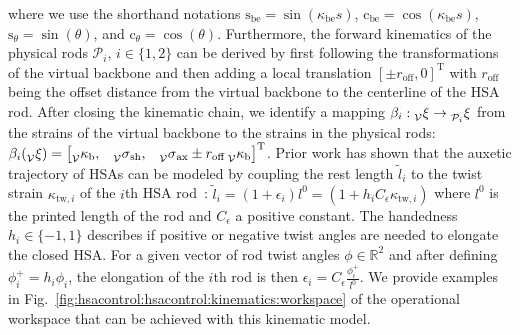 where we use the shorthand notations $\mathrm{s}_\mathrm{be} = \sin(\kappa_\mathrm{be}s)$, $\mathrm{c}_\mathrm{be} = \cos(\kappa_\mathrm{be}s)$, $\mathrm{s}_\theta = \sin(\theta)$, and $\mathrm{c}_\theta = \cos(\theta)$.
Furthermore, the forward kinematics of the physical rods $\mathcal{P}_i, \, i \in \{1, 2\}$ can be derived by first following the transformations of the virtual backbone and then adding a local translation $[\pm r_{\mathrm{off}},0]^\mathrm{T}$ with $r_\mathrm{off}$ being the offset distance from the virtual backbone to the centerline of the \gls{HSA} rod. 
After closing the kinematic chain, we identify a mapping $\beta_i: \prescript{}{\mathcal{V}}{\xi} \rightarrow \prescript{}{\mathcal{P}_i}{\xi}$ from the strains of the virtual backbone to the strains in the physical rods: $\beta_i(\prescript{}{\mathcal{V}}{\xi}) = \begin{bmatrix}
    \prescript{}{\mathcal{V}}{\kappa}_\mathrm{b}, & \prescript{}{\mathcal{V}}{\sigma}_\mathrm{sh}, & \prescript{}{\mathcal{V}}{\sigma}_\mathrm{ax} \pm r_{\mathrm{off}}  \prescript{}{\mathcal{V}}{\kappa}_\mathrm{b}
\end{bmatrix}^\mathrm{T}$.
% 
Prior work has shown that the auxetic trajectory of \glspl{HSA} can be modeled by coupling the rest length $\tilde{l}_i$ to the twist strain $\kappa_{\mathrm{tw},i}$ of the $i$th \gls{HSA} rod~\cite{stolzle2023modelling, good2022expanding}: $\tilde{l}_i = (1 + \epsilon_i) l^0 = (1 + h_i C_\epsilon \kappa_{\mathrm{tw},i})$ where $l^0$ is the printed length of the rod and $C_\epsilon$ a positive constant.
The handedness $h_i \in \{-1, 1\}$ describes if positive or negative twist angles are needed to elongate the closed \gls{HSA}.
For a given vector of rod twist angles $\phi \in \mathbb{R}^2$ and after defining $\phi_{i}^+ = h_i \phi_i$, the elongation of the $i$th rod is then $\epsilon_i = C_\epsilon \frac{\phi_{i}^+}{l^0}$.
We provide examples in Fig.~\ref{fig:hsacontrol:hsacontrol:kinematics:workspace} of the operational workspace that can be achieved with this kinematic model.

